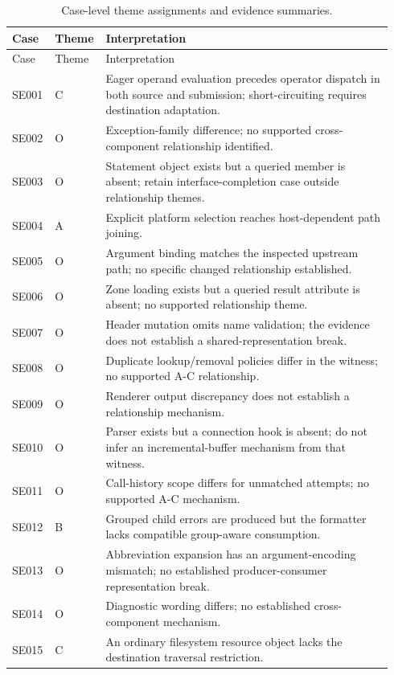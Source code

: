 \begin{longtable}{@{}p{0.10\linewidth}p{0.10\linewidth}p{0.74\linewidth}@{}}
\caption{Case-level theme assignments and evidence summaries.}\label{tab:case-theme-mapping}\\
\toprule Case & Theme & Interpretation \\ \midrule\endfirsthead
\toprule Case & Theme & Interpretation \\ \midrule\endhead
SE001 & C & Eager operand evaluation precedes operator dispatch in both source and submission; short-circuiting requires destination adaptation. \\
SE002 & O & Exception-family difference; no supported cross-component relationship identified. \\
SE003 & O & Statement object exists but a queried member is absent; retain interface-completion case outside relationship themes. \\
SE004 & A & Explicit platform selection reaches host-dependent path joining. \\
SE005 & O & Argument binding matches the inspected upstream path; no specific changed relationship established. \\
SE006 & O & Zone loading exists but a queried result attribute is absent; no supported relationship theme. \\
SE007 & O & Header mutation omits name validation; the evidence does not establish a shared-representation break. \\
SE008 & O & Duplicate lookup/removal policies differ in the witness; no supported A-C relationship. \\
SE009 & O & Renderer output discrepancy does not establish a relationship mechanism. \\
SE010 & O & Parser exists but a connection hook is absent; do not infer an incremental-buffer mechanism from that witness. \\
SE011 & O & Call-history scope differs for unmatched attempts; no supported A-C mechanism. \\
SE012 & B & Grouped child errors are produced but the formatter lacks compatible group-aware consumption. \\
SE013 & O & Abbreviation expansion has an argument-encoding mismatch; no established producer-consumer representation break. \\
SE014 & O & Diagnostic wording differs; no established cross-component mechanism. \\
SE015 & C & An ordinary filesystem resource object lacks the destination traversal restriction. \\

\end{longtable}
